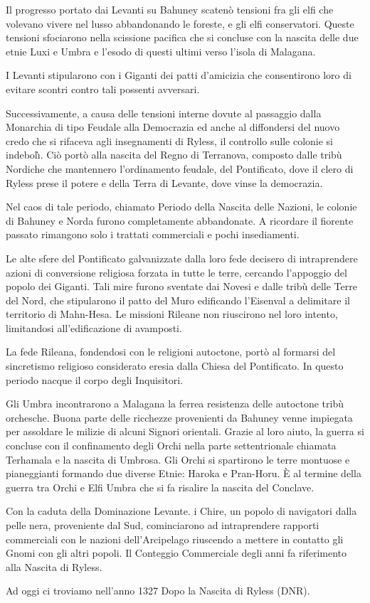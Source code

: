 Il progresso portato dai Levanti su Bahuney scaten\`o tensioni fra
gli elfi che volevano vivere nel lusso abbandonando le foreste, e gli
elfi conservatori. Queste tensioni sfociarono nella scissione pacifica
che si concluse con la nascita delle due etnie Luxi e Umbra e l'esodo di
questi ultimi verso l'isola di Malagana. 

I Levanti stipularono con i Giganti dei patti d'amicizia che
consentirono loro di evitare scontri contro tali possenti avversari.

Successivamente, a causa delle tensioni interne dovute al passaggio
dalla Monarchia di tipo Feudale alla Democrazia ed anche al
diffondersi del nuovo credo che si rifaceva agli insegnamenti di
Ryless, il controllo sulle colonie si indebol\`{\i}. Ci\`o port\`o
alla nascita del Regno di Terranova, composto dalle trib\`u Nordiche
che mantennero l'ordinamento feudale, del Pontificato, dove il clero
di Ryless prese il potere e della Terra di Levante, dove vinse la
democrazia.

Nel caos di tale periodo, chiamato Periodo della Nascita delle Nazioni,
le colonie di Bahuney e Norda furono completamente abbandonate. A
ricordare il fiorente passato rimangono solo i trattati commerciali e
pochi insediamenti.

Le alte sfere del Pontificato galvanizzate dalla loro fede decisero di
intraprendere azioni di conversione religiosa forzata in tutte le
terre, cercando l'appoggio del popolo dei Giganti. Tali mire furono
sventate dai Novesi e dalle trib\`u delle Terre del Nord, che
stipularono il patto del Muro edificando l'Eisenval a delimitare il
territorio di Mahn-Hesa. Le missioni Rileane non riuscirono nel loro
intento, limitandosi all'edificazione di avamposti. 

La fede Rileana, fondendosi con le religioni autoctone, port\`o al
formarsi del sincretismo religioso considerato eresia dalla Chiesa del
Pontificato. In questo periodo nacque il corpo degli Inquisitori.

Gli Umbra incontrarono a Malagana la ferrea resistenza delle autoctone
trib\`u orchesche.  Buona parte delle ricchezze provenienti da Bahuney
venne impiegata per assoldare le milizie di alcuni Signori orientali.
Grazie al loro aiuto, la guerra si concluse con il confinamento degli
Orchi nella parte settentrionale chiamata Terhamala e la nascita di
Umbrosa.  Gli Orchi si spartirono le terre montuose e pianeggianti
formando due diverse Etnie: Haroka e Pran-Horu. \`E al termine della
guerra tra Orchi e Elfi Umbra che si fa risalire la nascita del
Conclave.

Con la caduta della Dominazione Levante. i Chire, un popolo di
navigatori dalla pelle nera, proveniente dal Sud, cominciarono ad
intraprendere rapporti commerciali con le nazioni dell'Arcipelago
riuscendo a mettere in contatto gli Gnomi con gli altri popoli. Il
Conteggio Commerciale degli anni fa riferimento alla Nascita di
Ryless. 

Ad oggi ci troviamo nell'anno 1327 Dopo la Nascita di Ryless (DNR).

